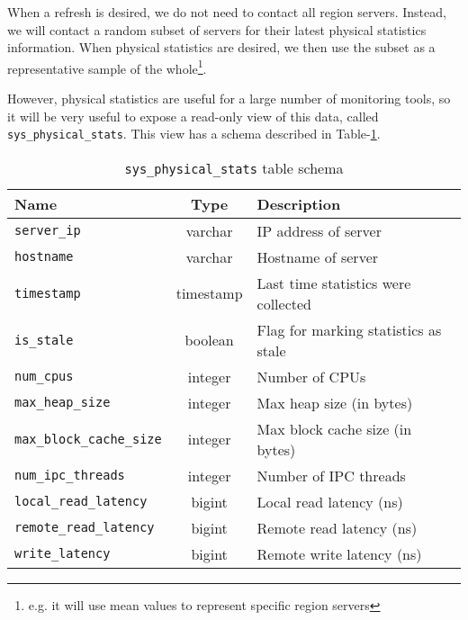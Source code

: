 When a refresh is desired, we do not need to contact all region servers. Instead, we will contact a random subset of servers for their latest physical statistics information. When physical statistics are desired, we then use the subset as a representative sample of the whole\footnote{e.g. it will use mean values to represent specific region servers}.

However, physical statistics are useful for a large number of monitoring tools, so it will be very useful to expose a read-only view of this data, called \texttt{sys\_physical\_stats}. This view has a schema described in Table-\ref{table:physicalStats}.

\begin{table}
				\begin{tabular}{|l|c|p{6cm}|}
								\hline
								\bf{Name}													& \bf{Type}	&	\bf{Description} \\ \hline	
								\texttt{server\_ip}								&	varchar		&	IP address of server \\ \hline
								\texttt{hostname}									&	varchar		&	Hostname of server \\ \hline
								\texttt{timestamp}								&	timestamp	&	Last time statistics were collected \\ \hline
								\texttt{is\_stale}								&	boolean		&	Flag for marking statistics as stale \\ \hline
								\texttt{num\_cpus}								&	integer		& Number of CPUs \\ \hline
								\texttt{max\_heap\_size}					&	integer		&	Max heap size (in bytes)\\ \hline
								\texttt{max\_block\_cache\_size}	&	integer		&	Max block cache size (in bytes) \\ \hline
								\texttt{num\_ipc\_threads}				&	integer		&	Number of IPC threads \\ \hline
								\texttt{local\_read\_latency}			&	bigint		&	Local read latency (ns) \\ \hline
								\texttt{remote\_read\_latency}		&	bigint		& Remote read latency (ns) \\ \hline
								\texttt{write\_latency}						&	bigint		&	Remote write latency (ns) \\ \hline
				\end{tabular}
				\caption{\texttt{sys\_physical\_stats} table schema}
				\label{table:physicalStats}
\end{table}

